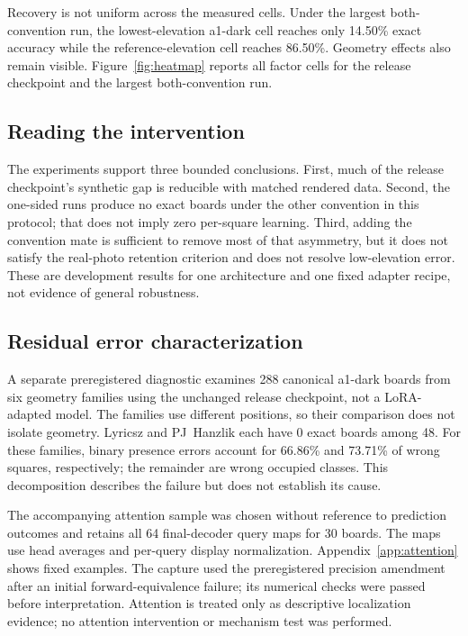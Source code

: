 Recovery is not uniform across the measured cells. Under the
largest both-convention run, the lowest-elevation a1-dark cell reaches only
14.50\% exact accuracy while the reference-elevation cell reaches 86.50\%.
Geometry effects also remain visible. Figure~\ref{fig:heatmap} reports all
factor cells for the release checkpoint and the largest both-convention run.

\subsection{Reading the intervention}

The experiments support three bounded conclusions. First, much of the release
checkpoint's synthetic gap is reducible with matched rendered data. Second,
the one-sided runs produce no exact boards under the other convention in this
protocol; that does not imply zero per-square learning.
Third, adding the convention mate is sufficient to remove most of that asymmetry,
but it does not satisfy the real-photo retention criterion and does not resolve
low-elevation error. These are development results for one architecture and one
fixed adapter recipe, not evidence of general robustness.

\subsection{Residual error characterization}

A separate preregistered diagnostic examines 288 canonical a1-dark boards from
six geometry families using the unchanged release checkpoint, not a LoRA-adapted model. The families
use different positions, so their comparison does not isolate geometry. Lyricsz and
PJ~Hanzlik each have 0 exact boards among 48. For these families, binary
presence errors account for 66.86\% and 73.71\% of wrong squares, respectively;
the remainder are wrong occupied classes. This decomposition describes the
failure but does not establish its cause.

The accompanying attention sample was chosen without reference to prediction
outcomes and retains all 64 final-decoder query maps for 30 boards. The maps use
head averages and per-query display normalization. Appendix~\ref{app:attention}
shows fixed examples. The capture used the preregistered precision amendment after
an initial forward-equivalence failure; its numerical checks were passed before
interpretation. Attention is treated only as descriptive localization
evidence; no attention intervention or mechanism test was performed.
